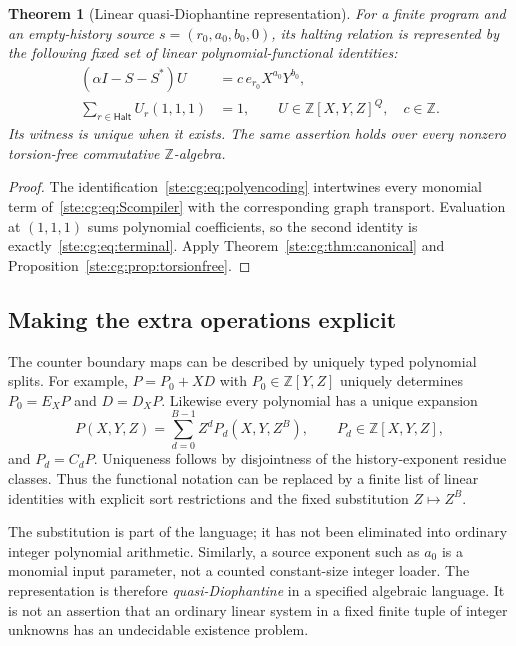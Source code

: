 \documentclass[11pt,letterpaper]{article}
\newtheorem{theorem}{Theorem}[section]
\theoremstyle{definition}
\theoremstyle{remark}
\newcommand{\Z}{\mathbb Z}
\newcommand{\Halt}{\mathsf{Halt}}
\begin{document}
\begin{theorem}[Linear quasi-Diophantine representation]\label{ste:cg:thm:poly}
For a finite program and an empty-history source $s=(r_0,a_0,b_0,0)$,
its halting relation is represented by the following fixed set of linear
polynomial-functional identities:
\begin{equation}\label{ste:cg:eq:polycertificate}
 \begin{split}
 (\alpha I-S-S^*)U&=c\,e_{r_0}X^{a_0}Y^{b_0},\\
 \sum_{r\in\Halt}U_r(1,1,1)&=1,
 \qquad U\in\Z[X,Y,Z]^Q,\quad c\in\Z.
 \end{split}
\end{equation}
Its witness is unique when it exists. The same assertion holds over every
nonzero torsion-free commutative $\Z$-algebra.
\end{theorem}
\begin{proof}
The identification~\eqref{ste:cg:eq:polyencoding} intertwines every monomial term
of~\eqref{ste:cg:eq:Scompiler} with the corresponding graph transport. Evaluation
at $(1,1,1)$ sums polynomial coefficients, so the second identity is
exactly~\eqref{ste:cg:eq:terminal}. Apply Theorem~\ref{ste:cg:thm:canonical} and
Proposition~\ref{ste:cg:prop:torsionfree}.
\end{proof}

\subsection{Making the extra operations explicit}
The counter boundary maps can be described by uniquely typed polynomial
splits. For example, $P=P_0+XD$ with $P_0\in\Z[Y,Z]$ uniquely determines
$P_0=E_XP$ and $D=D_XP$. Likewise every polynomial has a unique expansion
\begin{equation}\label{ste:cg:eq:residuesplit}
 P(X,Y,Z)=\sum_{d=0}^{B-1}Z^d P_d(X,Y,Z^B),
 \qquad P_d\in\Z[X,Y,Z],
\end{equation}
and $P_d=C_dP$. Uniqueness follows by disjointness of the history-exponent
residue classes. Thus the functional notation can be replaced by a finite
list of linear identities with explicit sort restrictions and the fixed
substitution $Z\mapsto Z^B$.

The substitution is part of the language; it has not been eliminated into
ordinary integer polynomial arithmetic. Similarly, a source exponent such
as $a_0$ is a monomial input parameter, not a counted constant-size integer
loader. The representation is therefore \emph{quasi-Diophantine} in a
specified algebraic language. It is not an assertion that an ordinary
linear system in a fixed finite tuple of integer unknowns has an
undecidable existence problem.
\end{document}
